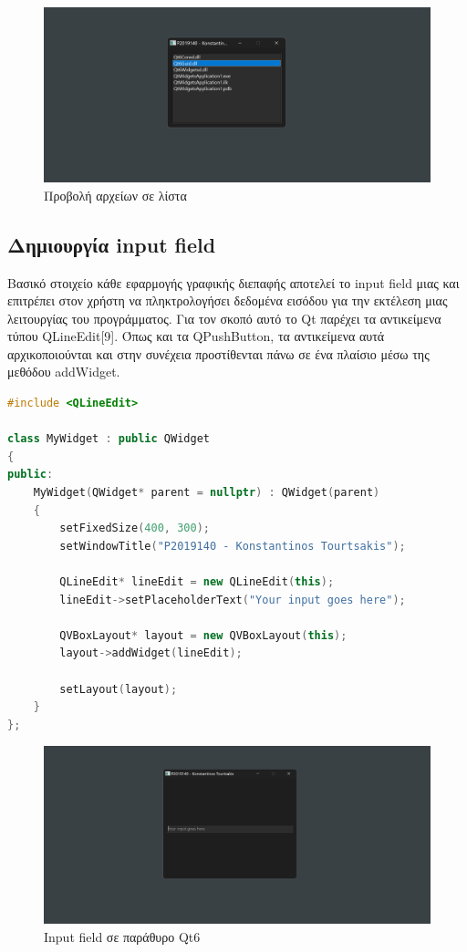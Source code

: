\begin{figure}[H]
    \centering
    \includegraphics[width=1.0\textwidth]{./images/QDir_file_reading.png}
    \caption{Προβολή αρχείων σε λίστα}
\end{figure}


\subsection{Δημιουργία input field}
Βασικό στοιχείο κάθε εφαρμογής γραφικής διεπαφής αποτελεί το input field μιας
και επιτρέπει στον χρήστη να πληκτρολογήσει δεδομένα εισόδου για την εκτέλεση
μιας λειτουργίας του προγράμματος. Για τον σκοπό αυτό το Qt παρέχει τα αντικείμενα
τύπου QLineEdit[9]. Όπως και τα QPushButton, τα αντικείμενα αυτά αρχικοποιούνται
και στην συνέχεια προστίθενται πάνω σε ένα πλαίσιο μέσω της μεθόδου addWidget.


\begin{lstlisting}[language=C++, style=cppstyle]
#include <QLineEdit>

class MyWidget : public QWidget 
{
public:
    MyWidget(QWidget* parent = nullptr) : QWidget(parent) 
    {
        setFixedSize(400, 300);
        setWindowTitle("P2019140 - Konstantinos Tourtsakis");

        QLineEdit* lineEdit = new QLineEdit(this);
        lineEdit->setPlaceholderText("Your input goes here");
        
        QVBoxLayout* layout = new QVBoxLayout(this);
        layout->addWidget(lineEdit);

        setLayout(layout);
    }
};
\end{lstlisting}


\begin{figure}[H]
    \centering
    \includegraphics[width=1.0\textwidth]{./images/QLineEdit.png}
    \caption{Input field σε παράθυρο Qt6}
\end{figure}



